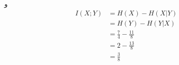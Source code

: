 \SubProblem
{و}
{
\begin{equation*}
\begin{aligned}
    I(X;Y)  &= H(X) - H(X|Y)\\
            &= H(Y) - H(Y|X)\\
            &= \frac{7}{4} - \frac{11}{8}\\
            &= 2 - \frac{13}{8}\\
            &= \frac{3}{8}
\end{aligned}
\end{equation*}
}